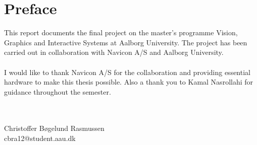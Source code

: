 \glsresetall
\section*{Preface}
This report documents the final project on the master's programme Vision, Graphics and Interactive Systems at Aalborg University. The project has been carried out in collaboration with Navicon A/S and Aalborg University.
\\\\
I would like to thank Navicon A/S for the collaboration and providing essential hardware to make this thesis possible. Also a thank you to Kamal Nasrollahi for guidance throughout the semester.


\vfill
~\\
\makebox[8 cm]{\hrulefill}\\
Christoffer Bøgelund Rasmussen\\
cbra12@student.aau.dk\\
